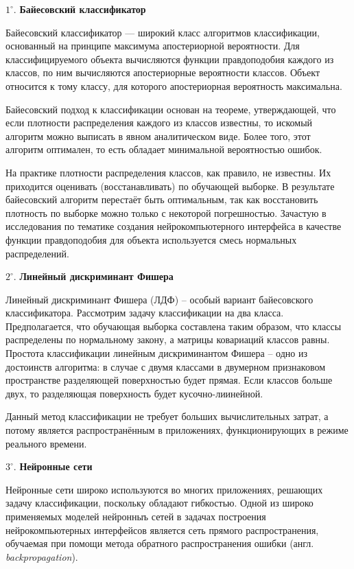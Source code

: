 \documentclass[12pt,fleqn]{article}
\begin{document}
	\par $1^{\circ}.$ {\bf Байесовский классификатор}
	\par Байесовский классификатор — широкий класс алгоритмов классификации, основанный на принципе максимума апостериорной вероятности. Для классифицируемого объекта вычисляются функции правдоподобия каждого из классов, по ним вычисляются апостериорные вероятности классов. Объект относится к тому классу, для которого апостериорная вероятность максимальна.
	\par Байесовский подход к классификации основан на теореме, утверждающей, что если плотности распределения каждого из классов известны, то искомый алгоритм можно выписать в явном аналитическом виде. Более того, этот алгоритм оптимален, то есть обладает минимальной вероятностью ошибок.
	\par На практике плотности распределения классов, как правило, не известны. Их приходится оценивать (восстанавливать) по обучающей выборке. В результате байесовский алгоритм перестаёт быть оптимальным, так как восстановить плотность по выборке можно только с некоторой погрешностью. Зачастую в исследования по тематике создания нейрокомпьютерного интерфейса в качестве функции правдоподобия для объекта используется смесь нормальных распределений.
	\par $2^{\circ}.$ {\bf Линейный дискриминант Фишера}
	\par Линейный дискриминант Фишера (ЛДФ) -- особый вариант байесовского классификатора. Рассмотрим задачу классификации на два класса. Предполагается, что обучающая выборка составлена таким образом, что классы распределены по нормальному закону, а матрицы ковариаций классов равны. Простота классификации линейным дискриминантом Фишера -- одно из достоинств алгоритма: в случае с двумя классами в двумерном признаковом пространстве разделяющей поверхностью будет прямая. Если классов больше двух, то разделяющая поверхность будет кусочно-лиинейной.
	\par Данный метод классификации не требует больших вычислительных затрат, а потому является распространённым в приложениях, функционирующих в режиме реального времени.
	\par $3^{\circ}.$ {\bf Нейронные сети}
	\par Нейронные сети широко используются во многих приложениях, решающих задачу классификации, поскольку обладают гибкостью. Одной из широко применяемых моделей нейронныъ сетей в задачах построения нейрокомпьютерных интерфейсов является сеть прямого распространения, обучаемая при помощи метода обратного распространения ошибки (англ. {\it backpropagation}). 
\end{document}
